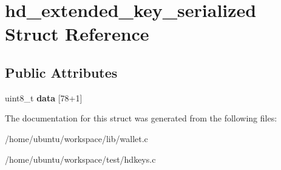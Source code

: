 \hypertarget{structhd__extended__key__serialized}{\section{hd\-\_\-extended\-\_\-key\-\_\-serialized Struct Reference}
\label{structhd__extended__key__serialized}
}
\subsection*{Public Attributes}
\begin{DoxyCompactItemize}
\item 
\hypertarget{structhd__extended__key__serialized_a4e876540d3db5d2e5e76df1de4a06b48}{uint8\-\_\-t {\bfseries data} \mbox{[}78+1\mbox{]}}\label{structhd__extended__key__serialized_a4e876540d3db5d2e5e76df1de4a06b48}

\end{DoxyCompactItemize}


The documentation for this struct was generated from the following files\-:\begin{DoxyCompactItemize}
\item 
/home/ubuntu/workspace/lib/wallet.\-c\item 
/home/ubuntu/workspace/test/hdkeys.\-c\end{DoxyCompactItemize}
